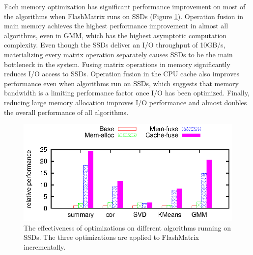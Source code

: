 Each memory optimization has significant performance improvement on most of
the algorithms when FlashMatrix runs on SSDs (Figure \ref{perf:em_opts}).
Operation fusion in main memory achieves
the highest performance improvement in almost all algorithms, even in GMM,
which has the highest asymptotic computation complexity. Even though the SSDs
deliver an I/O throughput of 10GB/s, materializing every matrix operation
separately causes SSDs to be the main bottleneck in the system.
Fusing matrix operations in memory significantly reduces I/O access to SSDs.
Operation fusion in the CPU cache also improves performance even when algorithms run on SSDs,
which suggests that memory bandwidth is a limiting performance factor once 
I/O has been optimized.
Finally, reducing large memory allocation improves I/O performance and almost doubles
the overall performance of all algorithms.

\begin{figure}
	\begin{center}
		\footnotesize
		\includegraphics{FlashMatrix_figs/opts-EM.eps}
		\vspace{-10pt}
		\caption{The effectiveness of optimizations on different algorithms
		running on SSDs. The three optimizations are applied to FlashMatrix
		incrementally.}
		\label{perf:em_opts}
	\end{center}
  \vspace{-15pt}
\end{figure}
